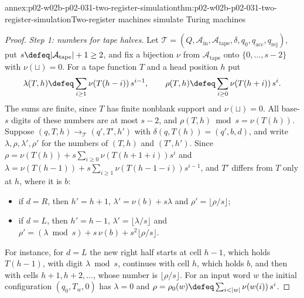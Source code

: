 \begin{annexitem}{annex:p02-w02b-p02-031-two-register-simulation}{thm:p02-w02b-p02-031-two-register-simulation}{Two-register machines simulate Turing machines}
\begin{proof}
\emph{Step 1: numbers for tape halves.}  Let \(\mathcal T=(Q,\mathcal
A_{\mathrm{in}},\mathcal A_{\mathrm{tape}},\delta,q_0,q_{\mathrm{acc}},
q_{\mathrm{rej}})\), put \(s\defeq\lvert\mathcal A_{\mathrm{tape}}\rvert+1\geq2\),
and fix a bijection \(\nu\) from \(\mathcal A_{\mathrm{tape}}\) onto
\(\{0,\ldots,s-2\}\) with \(\nu(\sqcup)=0\).  For a tape function \(T\) and a
head position \(h\) put
\[
 \lambda(T,h)\defeq\sum_{i\geq1}\nu(T(h-i))\,s^{i-1},\qquad
 \rho(T,h)\defeq\sum_{i\geq0}\nu(T(h+i))\,s^{i}.
\]
The sums are finite, since \(T\) has finite nonblank support and
\(\nu(\sqcup)=0\).  All base-\(s\) digits of these numbers are at most
\(s-2\), and \(\rho(T,h)\bmod s=\nu(T(h))\).  Suppose \((q,T,h)\longrightarrow
_{\mathcal T}(q',T',h')\) with \(\delta(q,T(h))=(q',b,d)\), and write
\(\lambda,\rho,\lambda',\rho'\) for the numbers of \((T,h)\) and \((T',h')\).
Since \(\rho=\nu(T(h))+s\sum_{i\geq0}\nu(T(h+1+i))s^{i}\) and
\(\lambda=\nu(T(h-1))+s\sum_{i\geq1}\nu(T(h-1-i))s^{i-1}\), and \(T'\) differs
from \(T\) only at \(h\), where it is \(b\):
\begin{itemize}
\item if \(d=R\), then \(h'=h+1\), \(\lambda'=\nu(b)+s\lambda\) and
      \(\rho'=\lfloor\rho/s\rfloor\);
\item if \(d=L\), then \(h'=h-1\), \(\lambda'=\lfloor\lambda/s\rfloor\) and
      \(\rho'=(\lambda\bmod s)+s\,\nu(b)+s^{2}\lfloor\rho/s\rfloor\).
\end{itemize}
For instance, for \(d=L\) the new right half starts at cell \(h-1\), which
holds \(T(h-1)\), with digit \(\lambda\bmod s\), continues with cell \(h\),
which holds \(b\), and then with cells \(h+1,h+2,\ldots\), whose number is
\(\lfloor\rho/s\rfloor\).  For an input word \(w\) the initial configuration
\((q_0,T_w,0)\) has \(\lambda=0\) and \(\rho=\rho_0(w)\defeq\sum_{i<\lvert
w\rvert}\nu(w(i))\,s^{i}\).


\end{proof}
\end{annexitem}
